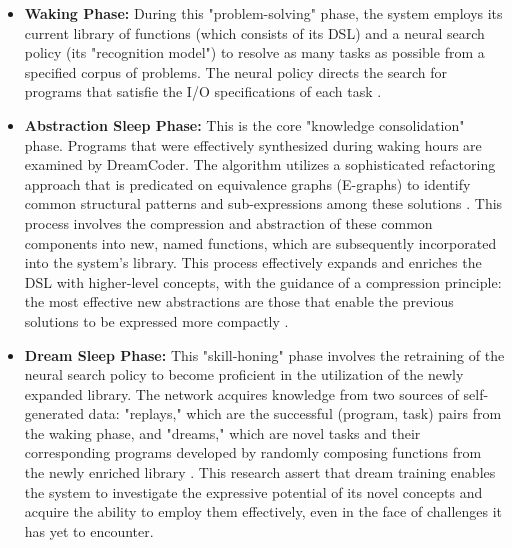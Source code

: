 \documentclass[12pt, a4paper]{report}
\begin{document}
\begin{itemize}
    \item \textbf{Waking Phase:} During this "problem-solving" phase, the system employs its current library of functions (which consists of its DSL) and a neural search policy (its "recognition model") to resolve as many tasks as possible from a specified corpus of problems. The neural policy directs the search for programs that satisfie the I/O specifications of each task \citep{ellis2021dreamcoder}.
    \item \textbf{Abstraction Sleep Phase:} This is the core "knowledge consolidation" phase. Programs that were effectively synthesized during waking hours are examined by DreamCoder. The algorithm utilizes a sophisticated refactoring approach that is predicated on equivalence graphs (E-graphs) to identify common structural patterns and sub-expressions among these solutions \citep{ellis2021dreamcoder}. This process involves the compression and abstraction of these common components into new, named functions, which are subsequently incorporated into the system's library. This process effectively expands and enriches the DSL with higher-level concepts, with the guidance of a compression principle: the most effective new abstractions are those that enable the previous solutions to be expressed more compactly \citep{ellis2021dreamcoder}.
    \item \textbf{Dream Sleep Phase:} This "skill-honing" phase involves the retraining of the neural search policy to become proficient in the utilization of the newly expanded library. The network acquires knowledge from two sources of self-generated data: "replays," which are the successful (program, task) pairs from the waking phase, and "dreams," which are novel tasks and their corresponding programs developed by randomly composing functions from the newly enriched library \citep{ellis2021dreamcoder}. This research assert that dream training enables the system to investigate the expressive potential of its novel concepts and acquire the ability to employ them effectively, even in the face of challenges it has yet to encounter.
\end{itemize}
\end{document}
